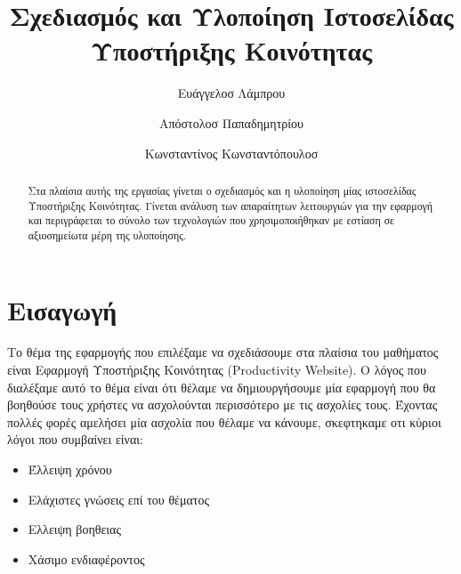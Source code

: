 \documentclass[nonacm, language=english, language=greek]{acmart}
\newcommand{\en}[1]{\textlatin{#1}}
\begin{document}
\title{Σχεδιασμός και Υλοποίηση Ιστοσελίδας Υποστήριξης Κοινότητας}

\author{Ευάγγελοσ Λάμπρου}
\orcid{}

\author{Απόστολοσ Παπαδημητρίου}

\author{Κωνσταντίνος Κωνσταντόπουλοσ}
\begin{abstract}
    Στα πλαίσια αυτής της εργασίας γίνεται ο σχεδιασμός και η υλοποίηση μίας 
    ιστοσελίδας Υποστήριξης Κοινότητας. Γίνεται ανάλυση των απαραίτητων 
    λειτουργιών για την εφαρμογή και περιγράφεται το σύνολο των τεχνολογιών 
    που χρησιμοποιήθηκαν με εστίαση σε αξιοσημείωτα μέρη της υλοποίησης.
\end{abstract}

\maketitle

\section{Εισαγωγή}

Το θέμα της εφαρμογής που επιλέξαμε να σχεδιάσουμε στα πλαίσια του μαθήματος είναι Εφαρμογή Υποστήριξης Κοινότητας (\en{Productivity Website}). Ο λόγος που διαλέξαμε αυτό το θέμα είναι ότι θέλαμε να δημιουργήσουμε μία εφαρμογή που θα βοηθούσε τους χρήστες να ασχολούνται περισσότερο με τις ασχολίες τους.
Έχοντας πολλές φορές αμελήσει μία ασχολία που θέλαμε να κάνουμε, σκεφτηκαμε οτι κύριοι λόγοι που συμβαίνει είναι:
\begin{itemize}
    \item Έλλειψη χρόνου
    \item Ελάχιστες γνώσεις επί του θέματος
    \item Ελλειψη βοηθειας
    \item Χάσιμο ενδιαφέροντος
\end{itemize}
\end{document}

